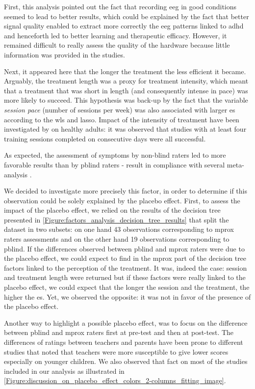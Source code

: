 First, this analysis pointed out the fact that recording \gls{eeg} in good conditions seemed to lead to better results, 
which could be explained by the fact that better signal quality enabled to extract more correctly the \gls{eeg} 
patterns linked to \gls{adhd} and henceforth led to better learning and therapeutic efficacy. However, it remained difficult to 
really assess the quality of the hardware because little information was provided in the studies.  

Next, it appeared here that the longer the treatment the less efficient it became. Arguably, the treatment length was a proxy 
for treatment intensity, which meant that a treatment that was short in length (and consequently intense in pace) 
was more likely to succeed. This hypothesis was back-up by the fact that the variable \emph{session pace} (number of sessions per week) 
was also associated with larger \gls{es} according to the \gls{wls} and \gls{lasso}. Impact of the intensity of treatment have been investigated
by \citep{Rogala2016} on healthy adults: it was observed that studies with at least four training sessions completed on consecutive days were all successful. 

As expected, the assessment of symptoms by non-blind raters led to more favorable results than by \gls{pblind} raters - 
result in compliance with several meta-analysis \citep{Cortese2016, Micoulaud2014}. 

We decided to investigate more precisely this factor, in order to determine if this observation could be solely explained by
the placebo effect. First, to assess the impact of the placebo effect, we relied on the results of the decision tree 
presented in \ref{Figure:factors_analysis_decision_tree_results} that split the dataset in two subsets: on one hand 43 observations corresponding 
to \gls{mprox} raters assessments and on the other hand 19 observations corresponding to \gls{pblind}. If the differences observed 
between \gls{pblind} and \gls{mprox} raters were due to the placebo effect, we could expect to find in the \gls{mprox} part of the decision 
tree factors linked to the perception of the treatment. It was, indeed the case: session and treatment length were returned but if
these factors were really linked to the placebo effect, we could expect that the longer the session and the treatment, the higher the \gls{es}. 
Yet, we observed the opposite: it was not in favor of the presence of the placebo effect. 

Another way to highlight a possible placebo effect, was to focus on the difference between \gls{pblind} and \gls{mprox} raters first at pre-test 
and then at post-test. The differences of ratings between teachers and parents have been prone to different studies \citep{Sollie2013, Narad2015, Minder2018}
that noted that teachers were more susceptible to give lower scores especially on younger children. We also observed that fact on most of the studies included 
in our analysis as illustrated in \ref{Figure:discussion_on_placebo_effect_colors_2-columns_fitting_image}.  

